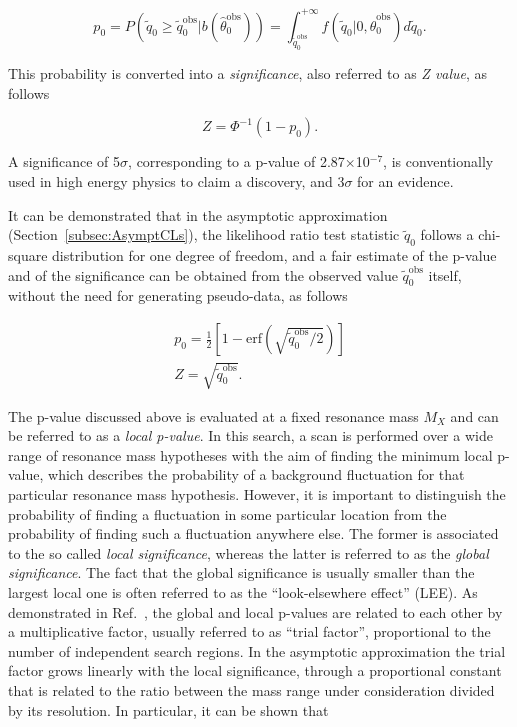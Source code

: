 \begin{equation}
p_0 = P(\tilde{q}_0 \geq \tilde{q}_0^\mathrm{obs}|b(\hat{\theta}_0^\mathrm{obs})) = \int_{\tilde{q}_0^\mathrm{obs}}^{+\infty} f(\tilde{q}_0|0,\hat{\theta}_0^\mathrm{obs})d\tilde{q}_0.
\end{equation}

This probability is converted into a \textit{significance}, also referred to as \textit{Z value}, as follows

\begin{equation}
Z = \Phi^{-1} (1-p_0).
\end{equation}

A significance of 5$\sigma$, corresponding to a p-value of 2.87$\times$10$^{-7}$, is conventionally used in high energy physics to claim a discovery,
and 3$\sigma$ for an evidence.

It can be demonstrated that in the asymptotic approximation (Section~\ref{subsec:AsymptCLs}), the likelihood ratio test statistic $\tilde{q}_0$
follows a chi-square distribution for one degree of freedom, and a fair estimate of the p-value and of the significance can be obtained from the observed value $\tilde{q}_0^\mathrm{obs}$ itself,
without the need for generating pseudo-data, as follows

\begin{equation}
\begin{gathered}
p_0 = \frac{1}{2} [ 1 - \mathrm{erf}(\sqrt{\tilde{q}_0^\mathrm{obs}/2}) ] \\
Z = \sqrt{\tilde{q}_0^\mathrm{obs}}.
\end{gathered}
\end{equation}

The p-value discussed above is evaluated at a fixed resonance mass $M_X$ and can be referred to as a \textit{local p-value}.
In this search, a scan is performed over a wide range of resonance mass hypotheses with the aim of finding
the minimum local p-value, which describes the probability of a background fluctuation for that particular resonance mass hypothesis.
However, it is important to distinguish the probability of finding a fluctuation in some particular location from the probability of finding such a fluctuation anywhere else.
The former is associated to the so called \textit{local significance}, whereas the latter is referred to as the \textit{global significance}.
The fact that the global significance is usually smaller than the largest local one is often referred to as the ``look-elsewhere effect'' (LEE).
As demonstrated in Ref.~\cite{Gross:2010qma}, the global and local p-values are related to each other by a multiplicative factor, usually referred to as ``trial factor'', proportional to the number of independent search regions.
In the asymptotic approximation the trial factor grows linearly with the local significance, through a proportional constant
that is related to the ratio between the mass range under consideration divided by its resolution. In particular, it can be shown that

